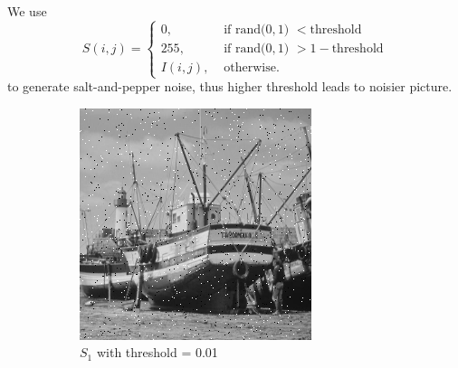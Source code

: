 \documentclass{article}
\begin{document}
\begin{enumerate}[label=(\alph*)]
    We use
    $$S(i, j) = 
    \begin{cases}
        0,          & \text{ if rand($0, 1$) } < \text{threshold}  \\
        255,        & \text{ if rand($0, 1$) } > 1 - \text{threshold}  \\
        I(i, j),    & \text{ otherwise}.
    \end{cases}
    $$
    to generate salt-and-pepper noise, thus higher threshold leads to noisier picture.
    \begin{figure}[!htb]
        \centering
        \begin{subfigure}[b]{0.3\textwidth}
            \includegraphics[width=\textwidth]{img/S1.png}
            \caption{$S_1$ with threshold = 0.01}
        \end{subfigure}
        ~
        \begin{subfigure}[b]{0.3\textwidth}

\end{subfigure}
\end{figure}
\end{enumerate}
\end{document}
